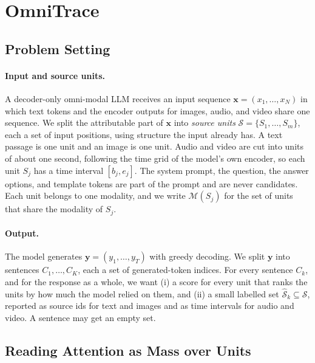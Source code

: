 \section{OmniTrace}
\label{sec:method}

\subsection{Problem Setting}
\label{sec:problem}

\paragraph{Input and source units.}
A decoder-only omni-modal LLM receives an input sequence $\mathbf{x}=(x_1,\dots,x_N)$ in which text tokens and the encoder outputs for images, audio, and video share one sequence.
We split the attributable part of $\mathbf{x}$ into \emph{source units} $\mathcal{S}=\{S_1,\dots,S_m\}$, each a set of input positions, using structure the input already has.
A text passage is one unit and an image is one unit.
Audio and video are cut into units of about one second, following the time grid of the model's own encoder, so each unit $S_j$ has a time interval $[b_j,e_j]$.
The system prompt, the question, the answer options, and template tokens are part of the prompt and are never candidates.
Each unit belongs to one modality, and we write $\mathcal{M}(S_j)$ for the set of units that share the modality of $S_j$.

\paragraph{Output.}
The model generates $\mathbf{y}=(y_1,\dots,y_T)$ with greedy decoding. We split $\mathbf{y}$ into sentences $C_1,\dots,C_K$, each a set of generated-token indices.
For every sentence $C_k$, and for the response as a whole, we want (i) a score for every unit that ranks the units by how much the model relied on them, and (ii) a small labelled set $\hat{\mathcal{S}}_k\subseteq\mathcal{S}$, reported as source ids for text and images and as time intervals for audio and video.
A sentence may get an empty set.

\subsection{Reading Attention as Mass over Units}
\label{sec:scoring}

